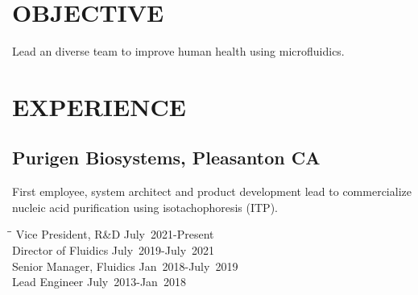 \documentclass{res}
\begin{document}

\address{\bf  Address\\ 1125 Court Street \\ Alameda, CA 94538 \\ (650) 391-8463}

\address{\bf  Citizenship\\United States \\ \\ \bf E-Mail \\ lewis.a.marshall@gmail.com}

\begin{resume}

\section{OBJECTIVE}
    Lead an diverse team to improve human health using microfluidics.


\section{EXPERIENCE}
   \vspace{-0.1in}

   \subsection{Purigen Biosystems, Pleasanton CA}
   \vspace{-0.1in}
    First employee, system architect and product development lead to
    commercialize nucleic acid purification using isotachophoresis (ITP).
   \vspace{-0.1in}

   \begin{tabbing}
   \hspace{2.1in}\= \hspace{2.9in}\= \kill
   Vice President, R\&D  \> July~2021-Present \\
   Director of Fluidics \> July~2019-July~2021 \\
   Senior Manager, Fluidics \> Jan~2018-July~2019\\
   Lead Engineer        \>July~2013-Jan~2018 \\
   \end{tabbing}\vspace{-20pt}      %


\end{resume}
\end{document}
